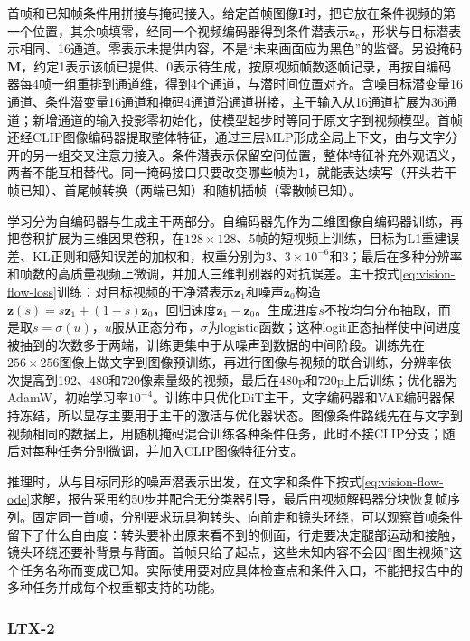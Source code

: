 首帧和已知帧条件用拼接与掩码接入。给定首帧图像$\bm I$时，把它放在条件视频的第一个位置，其余帧填零，经同一个视频编码器得到条件潜表示$\bm z_{\mathrm c}$，形状与目标潜表示相同、16通道。零表示未提供内容，不是“未来画面应为黑色”的监督。另设掩码$\bm M$，约定1表示该帧已提供、0表示待生成，按原视频帧数逐帧记录，再按自编码器每4帧一组重排到通道维，得到4个通道，与潜时间位置对齐。含噪目标潜变量16通道、条件潜变量16通道和掩码4通道沿通道拼接，主干输入从16通道扩展为36通道；新增通道的输入投影零初始化，使模型起步时等同于原文字到视频模型。首帧还经CLIP图像编码器提取整体特征，通过三层MLP形成全局上下文，由与文字分开的另一组交叉注意力接入。条件潜表示保留空间位置，整体特征补充外观语义，两者不能互相替代。同一掩码接口只要改变哪些帧为1，就能表达续写（开头若干帧已知）、首尾帧转换（两端已知）和随机插帧（零散帧已知）。

学习分为自编码器与生成主干两部分。自编码器先作为二维图像自编码器训练，再把卷积扩展为三维因果卷积，在$128\times128$、5帧的短视频上训练，目标为L1重建误差、KL正则和感知误差的加权和，权重分别为3、$3\times10^{-6}$和3；最后在多种分辨率和帧数的高质量视频上微调，并加入三维判别器的对抗误差。主干按式\eqref{eq:vision-flow-loss}训练：对目标视频的干净潜表示$\bm z_1$和噪声$\bm z_0$构造$\bm z(s)=s\bm z_1+(1-s)\bm z_0$，回归速度$\bm z_1-\bm z_0$。生成进度$s$不按均匀分布抽取，而是取$s=\sigma(u)$，$u$服从正态分布，$\sigma$为logistic函数；这种logit正态抽样使中间进度被抽到的次数多于两端，训练更集中于从噪声到数据的中间阶段。训练先在$256\times256$图像上做文字到图像预训练，再进行图像与视频的联合训练，分辨率依次提高到192、480和720像素量级的视频，最后在480p和720p上后训练；优化器为AdamW，初始学习率$10^{-4}$。训练中只优化DiT主干，文字编码器和VAE编码器保持冻结，所以显存主要用于主干的激活与优化器状态。图像条件路线先在与文字到视频相同的数据上，用随机掩码混合训练各种条件任务，此时不接CLIP分支；随后对每种任务分别微调，并加入CLIP图像特征分支。

推理时，从与目标同形的噪声潜表示出发，在文字和条件下按式\eqref{eq:vision-flow-ode}求解，报告采用约50步并配合无分类器引导，最后由视频解码器分块恢复帧序列。固定同一首帧，分别要求玩具狗转头、向前走和镜头环绕，可以观察首帧条件留下了什么自由度：转头要补出原来看不到的侧面，行走要决定腿部运动和接触，镜头环绕还要补背景与背面。首帧只给了起点，这些未知内容不会因“图生视频”这个任务名称而变成已知。实际使用要对应具体检查点和条件入口，不能把报告中的多种任务并成每个权重都支持的功能。

\subsubsection{LTX-2}
\label{sec:vision-models-ltx2}

